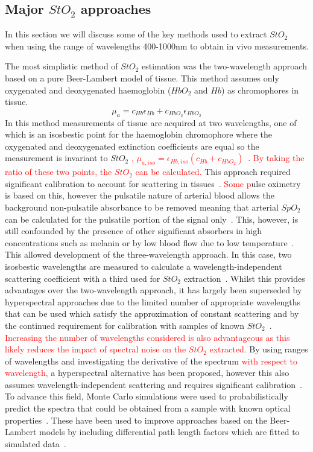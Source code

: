 \subsection{Major $StO_2$ approaches}
In this section we will discuss some of the key methods used to extract $StO_2$ when using the range of wavelengths 400-1000nm to obtain in vivo measurements. 

The most simplistic method of $StO_2$ estimation was the two-wavelength approach based on a pure Beer-Lambert model of tissue. This method assumes only oxygenated and deoxygenated haemoglobin ($HbO_2$ and $Hb$) as chromophores in tissue. 
\begin{equation}
    \mu_a = c_{Hb}\epsilon_{Hb} + c_{HbO_2}\epsilon_{HbO_2}
\end{equation}
In this method measurements of tissue are acquired at two wavelengths, one of which is an isosbestic point for the haemoglobin chromophore where the oxygenated and deoxygenated extinction coefficients are equal so the measurement is invariant to $StO_2$ \textcolor{red}{, $\mu_{a, iso} = \epsilon_{Hb, iso}(c_{Hb} + c_{HbO_2})$}~\citep{MacKenzie2018}. \textcolor{red}{By taking the ratio of these two points, the $StO_2$ can be calculated.} This approach required significant calibration to account for scattering in tissues~\citep{MacKenzie2018}.  \textcolor{red}{Some p}ulse oximetry is based on this, however the pulsatile nature of arterial blood allows the background non-pulsatile absorbance to be removed meaning that arterial $SpO_2$ can be calculated for the pulsatile portion of the signal only~\citep{MacKenzie2018}. This, however, is still confounded by the presence of other significant absorbers in high concentrations such as melanin or by low blood flow due to low temperature~\citep{Bangash2022, MacKenzie2018}. This allowed development of the three-wavelength approach. In this case, two isosbestic wavelengths are measured to calculate a wavelength-independent scattering coefficient with a third used for $StO_2$ extraction~\citep{MacKenzie2018}. Whilst this provides advantages over the two-wavelength approach, it has largely been superseded by hyperspectral approaches due to the limited number of appropriate wavelengths that can be used which satisfy the approximation of constant scattering and by the continued requirement for calibration with samples of known $StO_2$~\citep{MacKenzie2018}.  \textcolor{red}{Increasing the number of wavelengths considered is also advantageous as this likely reduces the impact of spectral noise on the $StO_2$ extracted.} By using ranges of wavelengths and investigating the derivative of the spectrum  \textcolor{red}{with respect to wavelength,} a hyperspectral alternative has been proposed, however this also assumes wavelength-independent scattering and requires significant calibration~\citep{Holmer2018}. To advance this field, Monte Carlo simulations were used to probabilistically predict the spectra that could be obtained from a sample with known optical properties~\citep{Wang1995}. These have been used to improve approaches based on the Beer-Lambert models by including differential path length factors which are fitted to simulated data~\citep{Clancy2020}. 

